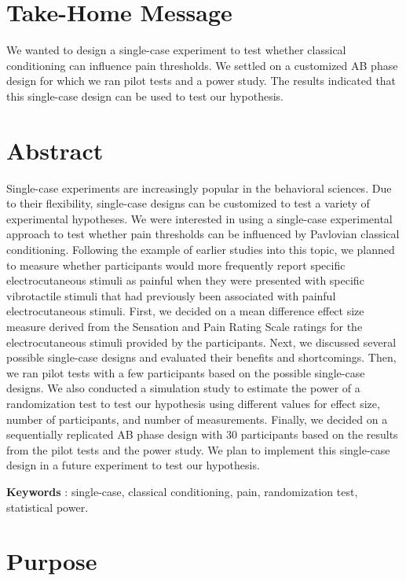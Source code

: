 \documentclass{article}
\begin{document}
  \section{Take-Home Message} 

We wanted to design a single-case experiment to test whether classical conditioning can influence pain thresholds. We settled on a customized AB phase design for which we ran pilot tests and a power study. The results indicated that this single-case design can be used to test our hypothesis.

\section{Abstract} 

Single-case experiments are increasingly popular in the behavioral sciences. Due to their flexibility, single-case designs can be customized to test a variety of experimental hypotheses. We were interested in using a single-case experimental approach to test whether pain thresholds can be influenced by Pavlovian classical conditioning. Following the example of earlier studies into this topic, we planned to measure whether participants would more frequently report specific electrocutaneous stimuli as painful when they were presented with specific vibrotactile stimuli that had previously been associated with painful electrocutaneous stimuli. First, we decided on a mean difference effect size measure derived from the Sensation and Pain Rating Scale ratings for the electrocutaneous stimuli provided by the participants. Next, we discussed several possible single-case designs and evaluated their benefits and shortcomings. Then, we ran pilot tests with a few participants based on the possible single-case designs. We also conducted a simulation study to estimate the power of a randomization test to test our hypothesis using different values for effect size, number of participants, and number of measurements. Finally, we decided on a sequentially replicated AB phase design with 30 participants based on the results from the pilot tests and the power study. We plan to implement this single-case design in a future experiment to test our hypothesis. 

\textbf{Keywords} : single-case, classical conditioning, pain, randomization test, statistical power. 

\section{Purpose} 
\end{document}
